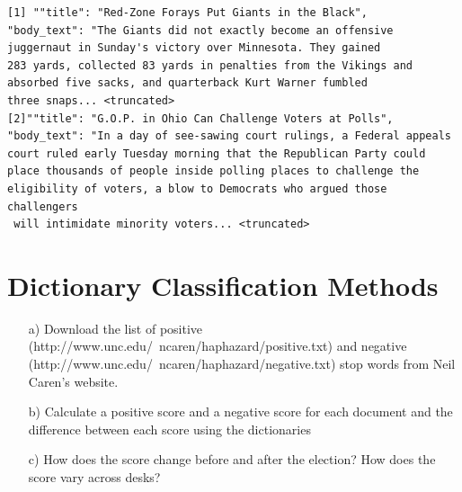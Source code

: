 \documentclass[12pt,letterpaper]{article}
\begin{document}
  

\begin{Verbatim}[fontsize=\footnotesize]
[1] ""title": "Red-Zone Forays Put Giants in the Black",
"body_text": "The Giants did not exactly become an offensive 
juggernaut in Sunday's victory over Minnesota. They gained
283 yards, collected 83 yards in penalties from the Vikings and 
absorbed five sacks, and quarterback Kurt Warner fumbled 
three snaps... <truncated>
[2]""title": "G.O.P. in Ohio Can Challenge Voters at Polls", 
"body_text": "In a day of see-sawing court rulings, a Federal appeals 
court ruled early Tuesday morning that the Republican Party could 
place thousands of people inside polling places to challenge the
eligibility of voters, a blow to Democrats who argued those challengers
 will intimidate minority voters... <truncated>
\end{Verbatim}

\section{Dictionary Classification Methods}
\begin{itemize}
\item[a)] Download the list of positive (http://www.unc.edu/~ncaren/haphazard/positive.txt) and negative (http://www.unc.edu/~ncaren/haphazard/negative.txt) stop words from Neil Caren's website.
\item[b)] Calculate a positive score and a negative score for each document and the difference between each score using the dictionaries
\end{itemize}



\begin{itemize}
\item[c)] How does the score change before and after the election?  How does the score vary across desks?
\end{itemize}

  
\end{document}
